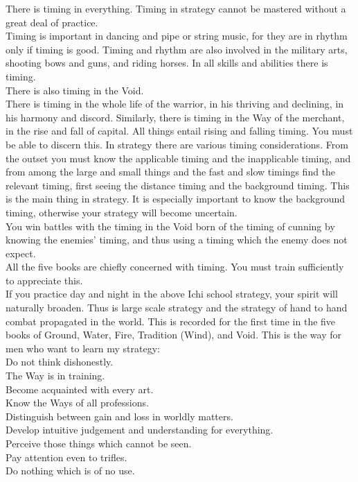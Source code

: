 There is timing in everything. Timing in strategy cannot be mastered without a great deal of practice.\\

Timing is important in dancing and pipe or string music, for they are in rhythm only if timing is good. Timing and rhythm are also involved in the military arts, shooting bows and guns, and riding horses. In all skills and abilities there is timing.\\

There is also timing in the Void.\\

There is timing in the whole life of the warrior, in his thriving and declining, in his harmony and discord. Similarly, there is timing in the Way of the merchant, in the rise and fall of capital. All things entail rising and falling timing. You must be able to discern this. In strategy there are various timing considerations. From the outset you must know the applicable timing and the inapplicable timing, and from among the large and small things and the fast and slow timings find the relevant timing, first seeing the distance timing and the background timing. This is the main thing in strategy. It is especially important to know the background timing, otherwise your strategy will become uncertain.\\

You win battles with the timing in the Void born of the timing of cunning by knowing the enemies' timing, and thus using a timing which the enemy does not expect.\\

All the five books are chiefly concerned with timing. You must train sufficiently to appreciate this.\\

If you practice day and night in the above Ichi school strategy, your spirit will naturally broaden. Thus is large scale strategy and the strategy of hand to hand combat propagated in the world. This is recorded for the first time in the five books of Ground, Water, Fire, Tradition (Wind), and Void. This is the way for men who want to learn my strategy:\\

    Do not think dishonestly.\\
    The Way is in training.\\
    Become acquainted with every art.\\
    Know the Ways of all professions.\\
    Distinguish between gain and loss in worldly matters.\\
    Develop intuitive judgement and understanding for everything.\\
    Perceive those things which cannot be seen.\\
    Pay attention even to trifles.\\
    Do nothing which is of no use. \\

